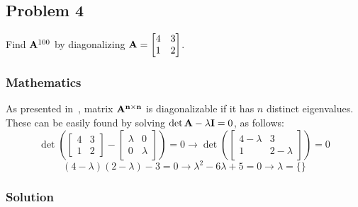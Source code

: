 \subsection{Problem 4}%
\label{sec:problem_4}

Find $\mathbf{A}^{100}$ by diagonalizing $\mathbf{A} = 
\begin{bmatrix}
    4 & 3\\
    1 & 2
\end{bmatrix}$.

\subsubsection*{Mathematics}

As presented in~\cite{Zdunek}, matrix $\mathbf{A^{n\times n}}$ is diagonalizable if it has 
$n$ distinct eigenvalues.
These can be easily found by solving $\det{\mathbf{A} - \lambda\mathbf{I}} = 0$, as follows:
\begin{equation*}
    \det{\left(\begin{bmatrix}
        4 & 3 \\
        1 & 2 
    \end{bmatrix} - 
    \begin{bmatrix}
        \lambda & 0 \\
        0 & \lambda
    \end{bmatrix}\right)} = 0 \rightarrow
    \det{\left(\begin{bmatrix}
        4 - \lambda & 3 \\
        1 & 2 - \lambda
    \end{bmatrix}\right)} = 0
\end{equation*}
\begin{equation*}
    (4 - \lambda)(2 - \lambda) - 3 = 0 \rightarrow
    \lambda^2 - 6\lambda + 5 = 0 \rightarrow
    \lambda = \{\}
\end{equation*}




\subsubsection*{Solution}
